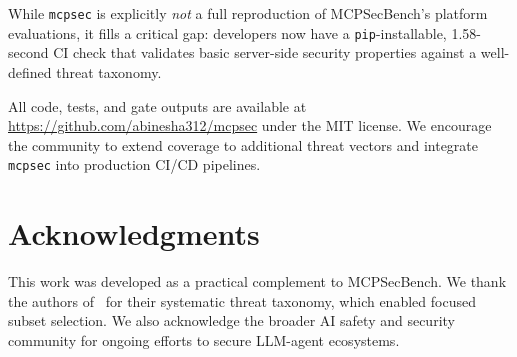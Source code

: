 \documentclass[11pt]{article}
\begin{document}
While \texttt{mcpsec} is explicitly \emph{not} a full reproduction of MCPSecBench's platform evaluations, it fills a critical gap: developers now have a \texttt{pip}-installable, 1.58-second CI check that validates basic server-side security properties against a well-defined threat taxonomy.

All code, tests, and gate outputs are available at \url{https://github.com/abinesha312/mcpsec} under the MIT license. We encourage the community to extend coverage to additional threat vectors and integrate \texttt{mcpsec} into production CI/CD pipelines.

\section*{Acknowledgments}

This work was developed as a practical complement to MCPSecBench. We thank the authors of~\cite{yang2025mcpsecbench} for their systematic threat taxonomy, which enabled focused subset selection. We also acknowledge the broader AI safety and security community for ongoing efforts to secure LLM-agent ecosystems.
\end{document}
